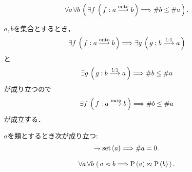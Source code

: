 	\begin{screen}
		\begin{thm}[全射が存在すれば濃度は大きい]
			\begin{align}
				\forall a\, \forall b\, \left(\, \exists f\, \left(\, f:a \overset{\mathrm{onto}}{\longrightarrow}  b\, \right)
				\Longrightarrow \# b \leq \# a\, \right).
			\end{align}
		\end{thm}
	\end{screen}
	
	\begin{prf}
		$a,b$を集合とするとき，
		\begin{align}
			\exists f\, \left(\, f:a \overset{\mathrm{onto}}{\longrightarrow} b\, \right)
			\Longrightarrow \exists g\, \left(\, g:b \overset{\mathrm{1:1}}{\longrightarrow}  a\, \right)
		\end{align}
		と
		\begin{align}
			\exists g\, \left(\, g:b \overset{\mathrm{1:1}}{\longrightarrow} a\, \right) \Longrightarrow \# b \leq \# a
		\end{align}
		が成り立つので
		\begin{align}
			\exists f\, \left(\, f:a \overset{\mathrm{onto}}{\longrightarrow} b\, \right) \Longrightarrow \# b \leq \# a
		\end{align}
		が成立する．
		\QED
	\end{prf}
	
	\begin{screen}
		\begin{thm}[真類の濃度は$0$]
			$a$を類とするとき次が成り立つ:
			\begin{align}
				\rightharpoondown \operatorname*{set} \left(a\right) \Longrightarrow \# a = 0.
			\end{align}
		\end{thm}
	\end{screen}
	
	\begin{screen}
		\begin{thm}[対等な集合同士は冪も対等]
			\begin{align}
				\forall a\, \forall b\, \left(\, a \approx b \Longrightarrow \operatorname*{P} \left(a\right) \approx \operatorname*{P} \left(b\right)\, \right).
			\end{align}
		\end{thm}
	\end{screen}
	
